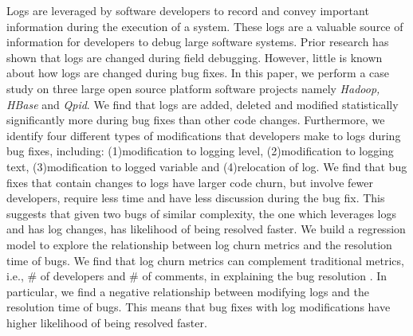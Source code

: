 Logs are leveraged by software developers to record and convey important information during the execution of a system. These logs are a valuable source of information for developers to debug large software systems. Prior research has shown that logs are changed during field debugging. However, little is known about how logs are changed during bug fixes. In this paper, we perform a  case study on three large open source platform software projects namely \emph{ Hadoop, HBase} and \emph{Qpid}. We find that logs are added, deleted and modified statistically significantly more during bug fixes than other code changes. Furthermore, we identify four different types of modifications that developers make to logs during bug fixes, including: (1)modification to logging level, (2)modification to logging text, (3)modification to logged variable and (4)relocation of log. We find that bug fixes that contain changes to logs have larger code churn, but involve fewer developers, require less time and have less discussion during the bug fix. This suggests that given two bugs of similar complexity, the one which leverages logs and has log changes, has likelihood of being resolved faster.  We build a regression model to explore the relationship between log churn metrics and the resolution time of bugs. We find that log churn metrics can complement traditional metrics, i.e., \# of developers and \# of comments, in explaining the bug resolution . In particular, we find a negative relationship between modifying logs and the resolution time of bugs. This means that bug fixes with log modifications have higher likelihood of being resolved faster.